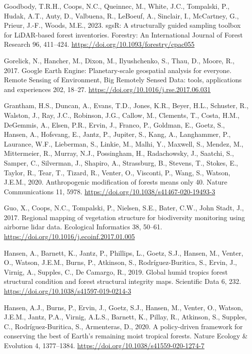 \documentclass[
]{agujournal2019}
\newlength{\cslhangindent}
\newenvironment{CSLReferences}[2] %
 {\begin{list}{}{%
  \setlength{\itemindent}{0pt}
  \setlength{\leftmargin}{0pt}
  \setlength{\parsep}{0pt}
  \ifodd #1
   \setlength{\leftmargin}{\cslhangindent}
   \setlength{\itemindent}{-1\cslhangindent}
  \fi
  \setlength{\itemsep}{#2\baselineskip}}}
 {\end{list}}
\begin{document}
\begin{CSLReferences}{1}{0}
Goodbody, T.R.H., Coops, N.C., Queinnec, M., White, J.C., Tompalski, P.,
Hudak, A.T., Auty, D., Valbuena, R., LeBoeuf, A., Sinclair, I.,
McCartney, G., Prieur, J.-F., Woods, M.E., 2023. sgsR: A structurally
guided sampling toolbox for LiDAR-based forest inventories. Forestry: An
International Journal of Forest Research 96, 411--424.
\url{https://doi.org/10.1093/forestry/cpac055}

Gorelick, N., Hancher, M., Dixon, M., Ilyushchenko, S., Thau, D., Moore,
R., 2017. Google Earth Engine: Planetary-scale geospatial analysis for
everyone. Remote Sensing of Environment, Big Remotely Sensed Data:
tools, applications and experiences 202, 18--27.
\url{https://doi.org/10.1016/j.rse.2017.06.031}

Grantham, H.S., Duncan, A., Evans, T.D., Jones, K.R., Beyer, H.L.,
Schuster, R., Walston, J., Ray, J.C., Robinson, J.G., Callow, M.,
Clements, T., Costa, H.M., DeGemmis, A., Elsen, P.R., Ervin, J., Franco,
P., Goldman, E., Goetz, S., Hansen, A., Hofsvang, E., Jantz, P.,
Jupiter, S., Kang, A., Langhammer, P., Laurance, W.F., Lieberman, S.,
Linkie, M., Malhi, Y., Maxwell, S., Mendez, M., Mittermeier, R., Murray,
N.J., Possingham, H., Radachowsky, J., Saatchi, S., Samper, C.,
Silverman, J., Shapiro, A., Strassburg, B., Stevens, T., Stokes, E.,
Taylor, R., Tear, T., Tizard, R., Venter, O., Visconti, P., Wang, S.,
Watson, J.E.M., 2020. Anthropogenic modification of forests means only
40. Nature Communications 11, 5978.
\url{https://doi.org/10.1038/s41467-020-19493-3}

Guo, X., Coops, N.C., Tompalski, P., Nielsen, S.E., Bater, C.W., John
Stadt, J., 2017. Regional mapping of vegetation structure for
biodiversity monitoring using airborne lidar data. Ecological
Informatics 38, 50--61.
\url{https://doi.org/10.1016/j.ecoinf.2017.01.005}

Hansen, A., Barnett, K., Jantz, P., Phillips, L., Goetz, S.J., Hansen,
M., Venter, O., Watson, J.E.M., Burns, P., Atkinson, S.,
Rodríguez-Buritica, S., Ervin, J., Virnig, A., Supples, C., De Camargo,
R., 2019. Global humid tropics forest structural condition and forest
structural integrity maps. Scientific Data 6, 232.
\url{https://doi.org/10.1038/s41597-019-0214-3}

Hansen, A.J., Burns, P., Ervin, J., Goetz, S.J., Hansen, M., Venter, O.,
Watson, J.E.M., Jantz, P.A., Virnig, A.L.S., Barnett, K., Pillay, R.,
Atkinson, S., Supples, C., Rodríguez-Buritica, S., Armenteras, D., 2020.
A policy-driven framework for conserving the best of Earth{'}s remaining
moist tropical forests. Nature Ecology \& Evolution 4, 1377--1384.
\url{https://doi.org/10.1038/s41559-020-1274-7}


\end{CSLReferences}
\end{document}
